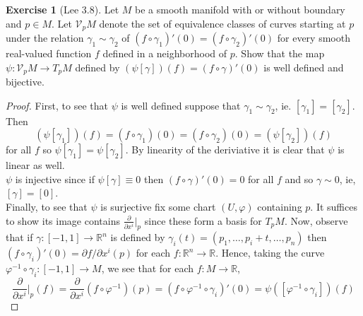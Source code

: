 \documentclass{article}
\newcommand{\bR}{\mathbb{R}}
\newcommand{\vp}{\varphi}
\newcommand{\cV}{\mathcal{V}}
\theoremstyle{definition}
\newtheorem{exercise}{Exercise}
\begin{document}
\begin{exercise}[Lee 3.8]
    Let $M$ be a smooth manifold with or without boundary and $p \in M$. Let $\cV_p M$ denote the set of equivalence classes of curves starting at $p$ under the relation $\gamma_1 \sim \gamma_2$ of $(f \circ \gamma_1)'(0) = (f \circ \gamma_2)'(0)$ for every smooth real-valued function $f$ defined in a neighborhood of $p$. Show that the map $\psi: \cV_pM \to T_pM$ defined by $(\psi[\gamma])(f) = (f \circ \gamma)'(0)$ is well defined and bijective.  
\end{exercise}

\begin{proof}
    First, to see that $\psi$ is well defined suppose that $\gamma_1 \sim \gamma_2$, ie. $[\gamma_1] = [\gamma_2]$. Then 
    \[ (\psi[\gamma_1])(f) = (f \circ \gamma_1)(0) = (f \circ \gamma_2)(0) = (\psi[\gamma_2])(f) \] 
    for all $f$ so $\psi[\gamma_1] = \psi[\gamma_2]$. By linearity of the deriviative it is clear that $\psi$ is linear as well. \\ 
$\psi$ is injective since if $\psi[\gamma] \equiv 0$ then $(f \circ \gamma)'(0)=0$ for all $f$ and so $\gamma \sim 0$, ie, $[\gamma]= [0]$. \\ 
Finally, to see that $\psi$ is surjective fix some chart $(U, \vp)$ containing $p$. It suffices to show its image contains $\frac{\partial}{\partial x^i}|_p$ since these form a basis for $T_pM$. Now, observe that if $\gamma: [-1,1] \to \bR^n$ is defined by $\gamma_i(t) = (p_1, \ldots, p_i+t, \ldots, p_n)$ then $(f \circ \gamma_i)'(0) = \partial f/\partial x^i (p)$ for each $f: \bR^n \to \bR$. Hence, taking the curve $\vp^{-1} \circ \gamma_i: [-1,1] \to M$, we see that for each $f: M \to \bR$, 
\[ \frac{\partial}{\partial x^i}|_p(f) = \frac{\partial}{\partial x^i}(f \circ \vp^{-1})(p)  = (f \circ \vp^{-1} \circ \gamma_i)'(0) = \psi([\vp^{-1} \circ \gamma_i])(f)  \]
\end{proof}
\end{document}
